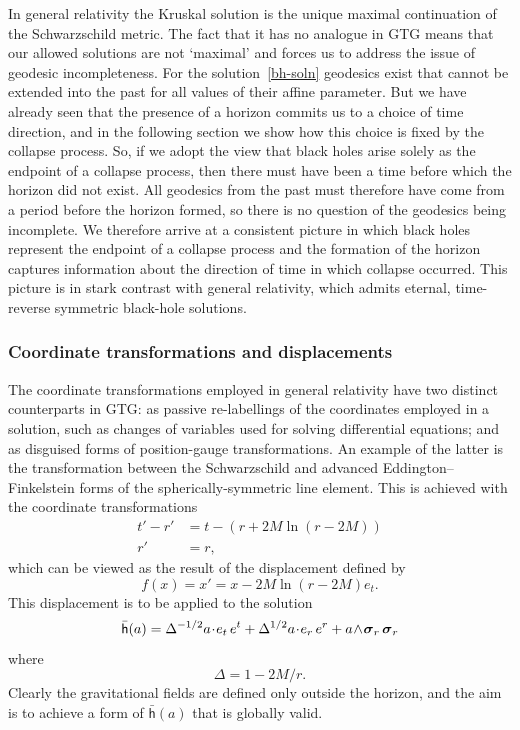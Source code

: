 \documentclass[a4paper]{article}
\numberwithin{equation}{section}
\newcommand{\dt}{\! \cdot \!}
\newcommand{\wdg}{\! \wedge \!}
\newcommand{\sig}{\mbox{\boldmath $\sigma$}}
\newcommand{\bsig}{\mbox{\boldmath $\sig$}}
\newcommand{\sigr}{\bsig_r}
\newcommand{\lbh}{\bar{\mathsf{h}}}
\newcommand{\ho}{\lbh}
\begin{document}
In general relativity the Kruskal solution is the unique maximal
continuation of the Schwarzschild metric.  The fact that it has no
analogue in GTG means that our allowed solutions are not `maximal' and
forces us to address the issue of geodesic incompleteness.  For the
solution~\eqref{bh-soln} geodesics exist that cannot be extended into
the past for all values of their affine parameter.  But we have
already seen that the presence of a horizon commits us to a choice of
time direction, and in the following section we show how this choice
is fixed by the collapse process.  So, if we adopt the view that black
holes arise solely as the endpoint of a collapse process, then there
must have been a time before which the horizon did not exist.  All
geodesics from the past must therefore have come from a period before
the horizon formed, so there is no question of the geodesics being
incomplete.  We therefore arrive at a consistent picture in which
black holes represent the endpoint of a collapse process and the
formation of the horizon captures information about the direction of
time in which collapse occurred.  This picture is in stark contrast
with general relativity, which admits eternal, time-reverse symmetric
black-hole solutions.


\subsubsection*{Coordinate transformations and displacements}

The coordinate transformations employed in general relativity have two
distinct counterparts in GTG: as passive re-labellings of the
coordinates employed in a solution, such as changes of variables used
for solving differential equations; and as disguised forms of
position-gauge transformations.  An example of the latter is the
transformation between the Schwarzschild and advanced
Eddington--Finkelstein forms of the spherically-symmetric line element.
This is achieved with the coordinate transformations
%
\begin{align}
t' - r' &= t - (r+2M \ln(r-2M)) \\
r' &= r,
\end{align}
%
which can be viewed as the result of the displacement defined by
%
\begin{equation}
f(x) = x' = x - 2M \ln(r-2M) e_t.
\label{SStrf1}
\end{equation} 
%
This displacement is to be applied to the solution
%
\begin{equation}
\ho(a) = \Delta^{-1/2} a \dt e_t\, e^t + \Delta^{1/2} a \dt e_r \, e^r
+ a \wdg \sigr \, \sigr
\label{SStrf2}
\end{equation} 
%
where
%
\begin{equation}
\Delta = 1-2M/r.
\end{equation}
%
Clearly the gravitational fields are defined only outside the horizon,
and the aim is to achieve a form of $\ho(a)$ that is globally valid.
\end{document}
